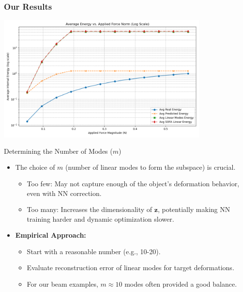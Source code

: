 \documentclass{beamer}
\begin{document}
\begin{frame}
    \frametitle{Our Results}
    \begin{centering}
        \includegraphics[width=0.8\textwidth]{Images/results_no_train.png}
    
    \end{centering}
\end{frame}

\begin{frame}{Determining the Number of Modes (\(m\))}
    \begin{itemize}
        \item The choice of \(m\) (number of linear modes to form the subspace) is crucial.
        \begin{itemize}
            \item Too few: May not capture enough of the object's deformation behavior, even with NN correction.
            \item Too many: Increases the dimensionality of \(\bm{z}\), potentially making NN training harder and dynamic optimization slower.
        \end{itemize}
        \item \textbf{Empirical Approach:}
        \begin{itemize}
            \item Start with a reasonable number (e.g., 10-20).
            \item Evaluate reconstruction error of linear modes for target deformations.
            \item For our beam examples, \(m \approx 10\) modes often provided a good balance.
        \end{itemize}
    \end{itemize}
\end{frame}
\end{document}
